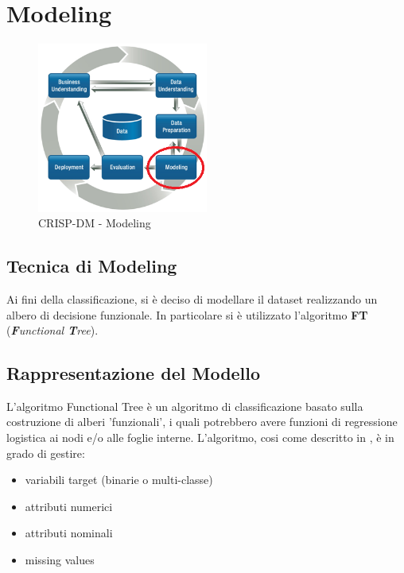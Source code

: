 \chapter{Modeling}

\begin{figure}[hbtp]
	\centering
	\includegraphics[width=0.5\textwidth]{./images/CRISPDM_4.png}
	\caption{CRISP-DM - Modeling}
	\label{CRISPDM_4}
\end{figure}

\section{Tecnica di Modeling}
Ai fini della classificazione, si è deciso di modellare il dataset realizzando un albero di decisione funzionale. In particolare si è utilizzato l'algoritmo \textbf{FT} (\emph{\textbf{F}unctional \textbf{T}ree}).

\section{Rappresentazione del Modello}
L'algoritmo Functional Tree è un algoritmo di classificazione basato sulla costruzione di alberi 'funzionali', i quali potrebbero avere funzioni di regressione logistica ai nodi e/o alle foglie interne. L'algoritmo, cosi come descritto in \cite{Gama:2004:FT:990375.990395}, è in grado di gestire:
\begin{itemize}
	\item variabili target (binarie o multi-classe)
	\item attributi numerici
	\item attributi nominali
	\item missing values
\end{itemize}

